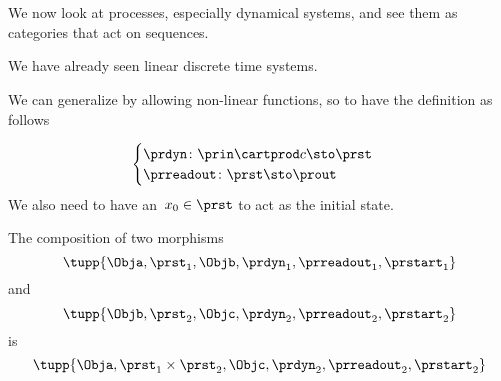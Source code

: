
\section{}

We now look at processes, especially dynamical systems, and see them as categories that act on sequences.

We have already seen linear discrete time systems.

We can generalize by allowing non-linear functions, so to have
the definition as follows

\begin{equation}
    \begin{cases}
    \prdyn \colon \prin \cartprod c\sto \prst \\
    \prreadout \colon \prst \sto \prout
    \end{cases}
\end{equation}
We also need to have an~$x_0 \in \prst$ to act as the initial state.

The composition of two morphisms
\begin{equation}
  \tupp{\Obja,\prst_1,\Objb,\prdyn_1,\prreadout_1,\prstart_1}
\end{equation}
and
\begin{equation}
\tupp{\Objb,\prst_2,\Objc,\prdyn_2,\prreadout_2,\prstart_2}
\end{equation}
is 
\begin{equation}
  \tupp{\Obja,\prst_1 \times \prst_2,\Objc,\prdyn_2,\prreadout_2,\prstart_2}
\end{equation}
%

